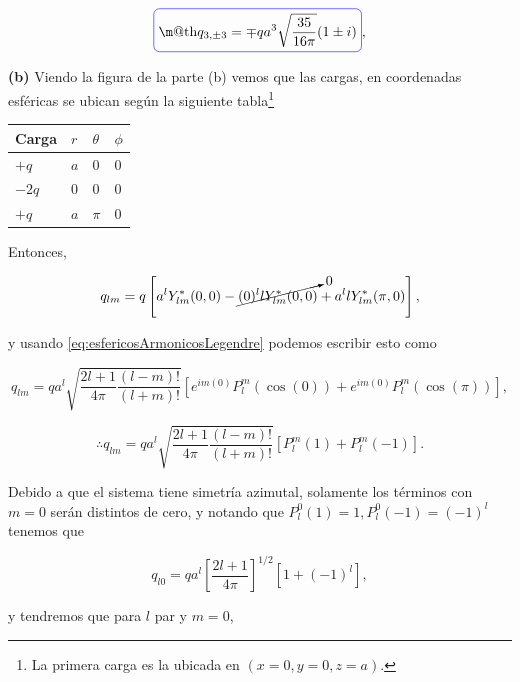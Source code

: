 \documentclass[a4paper,11pt]{article}
\makeatletter
\numberwithin{equation}{section}
\newcommand*{\boxcolor}{blue}
\renewcommand{\boxed}[1]{\textcolor{\boxcolor}{%
\tikz[baseline={([yshift=-1ex]current bounding box.center)}] \node [rectangle, minimum width=1ex,rounded corners,draw] {\normalcolor\m@th$\displaystyle#1$};}}
\makeatother
\begin{document}
\begin{equation}
 \boxed{q_{3,\pm 3} = \mp qa^3\sqrt{\frac{35}{16\pi}} (1 \pm i)},
\end{equation}

\newpage

\textbf{(b)} Viendo la figura de la parte (b) vemos que las cargas, en coordenadas 
esféricas se ubican según la siguiente tabla\footnote{La primera carga es la ubicada 
en $(x=0,y=0,z=a)$.}

\begin{table}[H]
\centering
\begin{tabular}{|l|l|l|l|}
\hline
Carga 	& $r$ & $\theta$ & $\phi$   \\ \hline
$+q$    & $a$ & $0$ 	 & $0$      \\ \hline
$-2q$   & $0$ & $0$	 & $0$  \\ \hline
$+q$    & $a$ & $\pi$  	 & $0$    \\ \hline
\end{tabular}
\end{table}

Entonces, 

\begin{equation}
 q_{lm} = q\left[a^lY^*_{lm}(0,0) - \cancelto{0}{(0)^l lY^*_{lm}(0,0)} + 
 a^llY^*_{lm}(\pi,0)\right],
\end{equation}

y usando \eqref{eq:esfericosArmonicosLegendre} podemos escribir esto como 

\begin{equation}
 q_{lm} = qa^l\sqrt{\frac{2l+1}{4\pi}\frac{(l-m)!}{(l+m)!}} 
 \left[ e^{im(0)}P_l^m(\cos(0)) + e^{im(0)}P_l^m(\cos(\pi)) \right],
\end{equation}

\begin{equation}
 \therefore q_{lm} = qa^l\sqrt{\frac{2l+1}{4\pi}\frac{(l-m)!}{(l+m)!}} 
 \left[P_l^m(1) + P_l^m(-1) \right].
\end{equation}

Debido a que el sistema tiene simetría azimutal, solamente los términos con 
$m=0$ serán distintos de cero, y notando que $P_l^0(1) = 1, P_l^0(-1) = (-1)^l$ 
tenemos que 

\begin{equation}
 q_{l0} = qa^l\left[\frac{2l+1}{4\pi} \right]^{1/2}\left[1 + (-1)^l\right],
\end{equation}

y tendremos que para $l$ par y $m=0$, 
\end{document}
